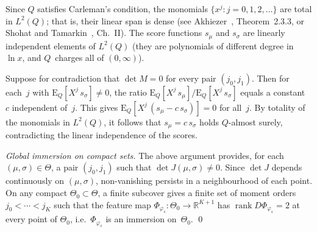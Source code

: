 \documentclass[11pt,a4paper]{article}
\newcommand{\E}{\mathrm{E}}
\newcommand{\R}{\mathbb{R}}
\begin{document}
Since $Q$ satisfies Carleman's condition, the monomials
$\{x^j : j = 0, 1, 2, \ldots\}$ are total in $L^2(Q)$; that is,
their linear span is dense (see Akhiezer~\cite{Akhiezer1965},
Theorem~2.3.3, or Shohat and
Tamarkin~\cite{ShohatTamarkin1943}, Ch.~II).  The score functions
$s_\mu$ and $s_\sigma$ are linearly independent elements of $L^2(Q)$
(they are polynomials of different degree in $\ln x$, and $Q$~charges
all of $(0,\infty)$).

Suppose for contradiction that $\det M = 0$ for every pair
$(j_0,j_1)$.  Then for each~$j$ with
$\E_Q[X^j\, s_\sigma] \neq 0$, the ratio
$\E_Q[X^j\, s_\mu] / \E_Q[X^j\, s_\sigma]$ equals a constant~$c$
independent of~$j$.  This gives
$\E_Q[X^j\,(s_\mu - c\, s_\sigma)] = 0$ for all~$j$.  By totality
of the monomials in $L^2(Q)$, it follows that
$s_\mu = c\, s_\sigma$ holds $Q$-almost surely, contradicting
the linear independence of the scores.

\emph{Global immersion on compact sets.}
The above argument provides, for each $(\mu,\sigma) \in \Theta$, a
pair $(j_0,j_1)$ such that $\det J(\mu,\sigma) \neq 0$.  Since
$\det J$ depends continuously on $(\mu,\sigma)$, non-vanishing
persists in a neighbourhood of each point.  On any compact
$\Theta_0 \subset \Theta$, a finite subcover gives a finite set of
moment orders $j_0 < \cdots < j_K$ such that the feature map
$\Phi_{\varphi_s} : \Theta_0 \to \R^{K+1}$ has
$\operatorname{rank} D\Phi_{\varphi_s} = 2$ at every point of
$\Theta_0$, i.e.\ $\Phi_{\varphi_s}$ is an immersion on~$\Theta_0$.
\qed

\end{document}
